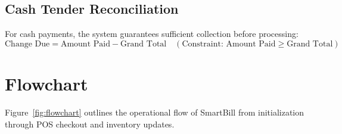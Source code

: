 \documentclass[12pt,a4paper]{article}
\begin{document}
\subsection{Cash Tender Reconciliation}
For cash payments, the system guarantees sufficient collection before processing:
\begin{equation}
    \text{Change Due} = \text{Amount Paid} - \text{Grand Total} \quad (\text{Constraint: } \text{Amount Paid} \ge \text{Grand Total})
\end{equation}

\section{Flowchart}
Figure~\ref{fig:flowchart} outlines the operational flow of SmartBill from initialization through POS checkout and inventory updates.
\end{document}

